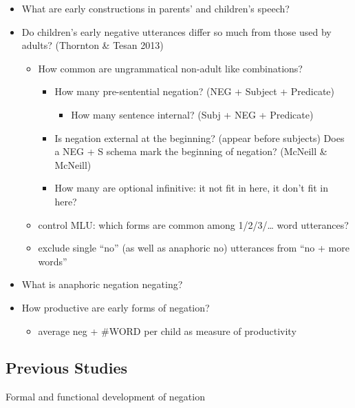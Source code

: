 \documentclass[man,floatsintext,draftall]{apa6}
\providecommand{\tightlist}{%
  \setlength{\itemsep}{0pt}\setlength{\parskip}{0pt}}
\begin{document}
\begin{itemize}
\item
  What are early constructions in parents' and children's speech?
\item
  Do children's early negative utterances differ so much from those used by adults? (Thornton \& Tesan 2013)

  \begin{itemize}
  \item
    How common are ungrammatical non-adult like combinations?

    \begin{itemize}
    \item
      How many pre-sentential negation? (NEG + Subject + Predicate)

      \begin{itemize}
      \tightlist
      \item
        How many sentence internal? (Subj + NEG + Predicate)
      \end{itemize}
    \item
      Is negation external at the beginning? (appear before subjects) Does a NEG + S schema mark the beginning of negation? (McNeill \& McNeill)
    \item
      How many are optional infinitive: it not fit in here, it don't fit in here?
    \end{itemize}
  \item
    control MLU: which forms are common among 1/2/3/\ldots{} word utterances?
  \item
    exclude single \enquote{no} (as well as anaphoric no) utterances from \enquote{no + more words}
  \end{itemize}
\item
  What is anaphoric negation negating?
\item
  How productive are early forms of negation?

  \begin{itemize}
  \tightlist
  \item
    average neg + \#WORD per child as measure of productivity
  \end{itemize}
\end{itemize}

\hypertarget{previous-studies}{%
\subsection{Previous Studies}\label{previous-studies}}

Formal and functional development of negation
\end{document}

